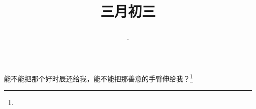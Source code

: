 \title{\date[d=11,m=4,y=2024][year:cn-y,年,month:cn,day:cn,日,·,weekday]·三月初三 }
能不能把那个好时辰还给我，能不能把那善意的手臂伸给我？\footnote{ }

